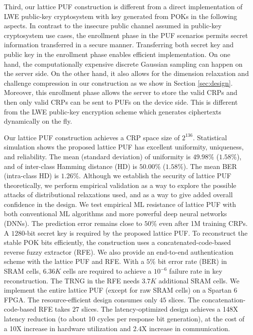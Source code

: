 Third, our lattice PUF construction is different from a direct implementation of LWE public-key cryptosystem with key generated from POKs in the following aspects. 
In contrast to the insecure public channel assumed in public-key cryptosystem use cases, the enrollment phase in the PUF scenarios permits secret information transferred in a secure manner. 
Transferring both secret key and public key in the enrollment phase enables efficient implementation. 
On one hand, the computationally expensive discrete Gaussian sampling can happen on the server side. 
On the other hand, it also allows for the dimension relaxation and challenge compression in our construction as we show in Section \ref{sec:design}.
Moreover, this enrollment phase allows the server to store the valid CRPs and then only valid CRPs can be sent to PUFs on the device side. 
This is different from the LWE public-key encryption scheme which generates ciphertexts dynamically on the fly.

Our lattice PUF construction achieves a CRP space size of $2^{136}$.
Statistical simulation shows the proposed lattice PUF has excellent uniformity, uniqueness, and reliability.
The mean (standard deviation) of uniformity is $49.98\%$ ($1.58\%$), and of inter-class Hamming distance (HD) is $50.00\%$ ($1.58\%$).
The mean BER (intra-class HD) is $1.26\%$.
Although we establish the security of lattice PUF theoretically, we perform empirical validation as a way to explore the possible attacks of distributional relaxations used, and as a way to give added overall confidence in the design. We test empirical ML resistance of lattice PUF with both conventional ML algorithms and more powerful deep neural networks (DNNs). The prediction error remains close to $50\%$ even after 1M training CRPs.
A $1280$-bit secret key is required by the proposed lattice PUF.
To reconstruct the stable POK bits efficiently, the construction uses a concatenated-code-based reverse fuzzy extractor (RFE). 
We also provide an end-to-end authentication scheme with the lattice PUF and RFE.
With a $5\%$ bit error rate (BER) in SRAM cells, $6.36K$ cells are required to achieve a $10^{-6}$ failure rate in key reconstruction.
The TRNG in the RFE needs $3.7K$ additional SRAM cells. 
We implement the entire lattice PUF (except for raw SRAM cells) on a Spartan 6 FPGA.
The resource-efficient design consumes only $45$ slices. 
The concatenation-code-based RFE takes $27$ slices. 
The latency-optimized design achieves a 148X latency reduction (to about 10 cycles per response bit generation), at the cost of a 10X increase in hardware utilization and 2.4X increase in communication.